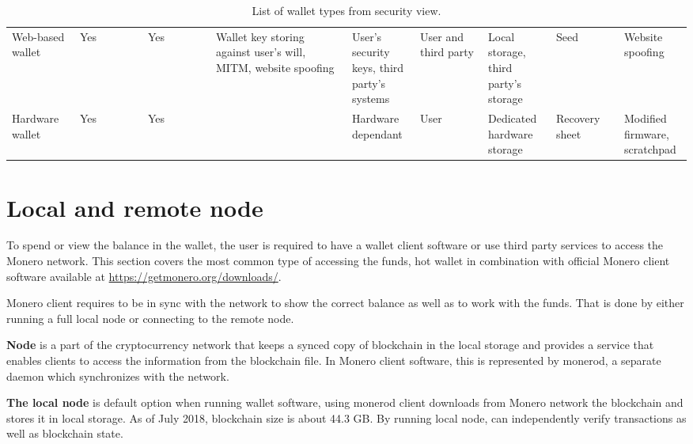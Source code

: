 \documentclass[
  printed, %
  table,   %
  nolof,     %
  nolot,     %
           oneside, color
]{fithesis3}
\begin{document}
\begin{table}
{\begin{tabular}{p{0.1\linewidth}p{0.1\linewidth}p{0.1\linewidth}p{0.2\linewidth}p{0.1\linewidth}p{0.1\linewidth}p{0.1\linewidth}p{0.1\linewidth}p{0.1\linewidth}}
Web-based wallet       & Yes                            & Yes               & Wallet key storing against user's will, MITM, website spoofing & User's security keys, third party's systems & User and third party & Local storage, third party's storage  & Seed             & Website spoofing              \\
Hardware wallet        & Yes                            & Yes               &                                                                & Hardware dependant                              & User               & Dedicated hardware storage          & Recovery sheet   & Modified firmware, scratchpad
\end{tabular}%
}
\caption{List of wallet types from security view.}
\label{table:wallettypes}
\end{table}\newpage



\section{Local and remote node}
To spend or view the balance in the wallet, the user is required to have a wallet client software or use third party services to access the Monero network. This section covers the most common type of accessing the funds, hot wallet in combination with official Monero client software available at \url{https://getmonero.org/downloads/}.

Monero client requires to be in sync with the network to show the correct balance as well as to work with the funds. That is done by either running a full local node or connecting to the remote node.

\textbf{Node} is a part of the cryptocurrency network that keeps a synced copy of blockchain in the local storage and provides a service that enables clients to access the information from the blockchain file. In Monero client software, this is represented by monerod, a separate daemon which synchronizes with the network.

\textbf{The local node} is default option when running wallet software, using monerod client downloads from Monero network the blockchain and stores it in local storage. As of July 2018, blockchain size is about 44.3 GB. By running local node, can independently verify transactions as well as blockchain state.
\end{document}

